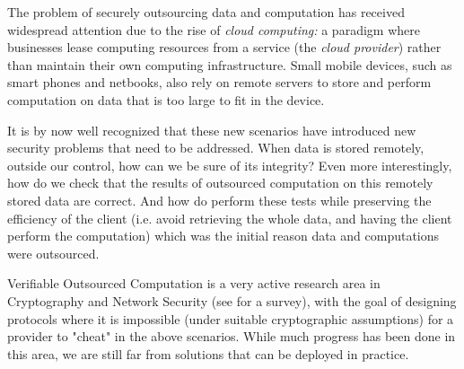 The problem of securely outsourcing data and computation has received widespread attention due to the rise of {\em cloud computing:} a paradigm where businesses lease computing resources from a service (the {\em cloud provider}) rather than maintain their own computing infrastructure.  Small mobile devices, such as smart phones and netbooks, also rely on remote servers to store and perform computation on data that is too large to fit in the device. 

It is by now well recognized that these new scenarios have introduced new security problems that need to be addressed. When data is stored remotely, outside our control, how can we be sure of its integrity? Even more interestingly, how do we check that the results of outsourced computation on this remotely stored data are correct. And how do perform these tests while preserving the efficiency of the client (i.e. avoid retrieving the whole data, and having the client perform the computation) which was the initial reason data and computations were outsourced. 

{\sf Verifiable Outsourced Computation} is a very active research area in Cryptography and Network Security (see \cite{wb15} for a survey), with the goal of designing protocols where it is impossible (under suitable cryptographic assumptions) for a provider to "cheat" in the above scenarios. While much progress has been done in this area, we are still far from solutions that can be deployed in practice. 



